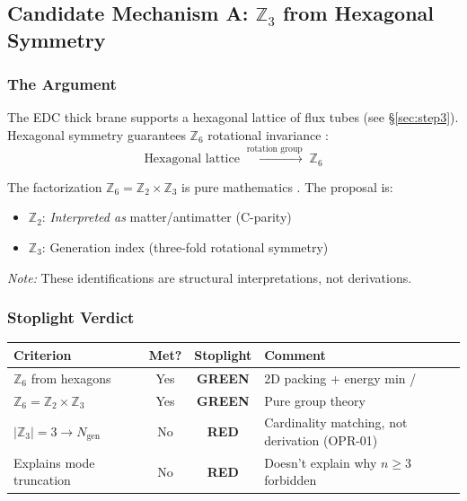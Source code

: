 \subsection{\texorpdfstring{Candidate Mechanism A: $\mathbb{Z}_3$ from Hexagonal Symmetry}{Candidate Mechanism A: Z3 from Hexagonal Symmetry}}
\label{sec:ch5_mechanism_a}

\subsubsection{The Argument}

The EDC thick brane supports a hexagonal lattice of flux tubes (see \S\ref{sec:step3}).
Hexagonal symmetry guarantees $\mathbb{Z}_6$ rotational invariance \tagDc{}:
\begin{equation}
    \text{Hexagonal lattice} \;\xrightarrow{\text{rotation group}}\; \mathbb{Z}_6
    \label{eq:ch5_hex_to_z6}
\end{equation}

The factorization $\mathbb{Z}_6 = \mathbb{Z}_2 \times \mathbb{Z}_3$ is pure
mathematics \tagM{}. The proposal is:
\begin{itemize}[nosep]
    \item $\mathbb{Z}_2$: \emph{Interpreted as} matter/antimatter (C-parity) \tagP{}
    \item $\mathbb{Z}_3$: Generation index (three-fold rotational symmetry) \tagP{}
\end{itemize}
\emph{Note:} These identifications are structural interpretations, not derivations.

\subsubsection{Stoplight Verdict}

\begin{center}
\small
\begin{tabular}{p{3cm}ccp{5cm}}
\toprule
\textbf{Criterion} & \textbf{Met?} & \textbf{Stoplight} & \textbf{Comment} \\
\midrule
$\mathbb{Z}_6$ from hexagons & Yes & \textcolor{green!50!black}{\textbf{GREEN}} & 2D packing + energy min \tagDc{}/\tagP{} \\
$\mathbb{Z}_6 = \mathbb{Z}_2 \times \mathbb{Z}_3$ & Yes & \textcolor{green!50!black}{\textbf{GREEN}} & Pure group theory \tagM{} \\
$|\mathbb{Z}_3| = 3 \to N_{\text{gen}}$ & No & \textcolor{red!80!black}{\textbf{RED}} & Cardinality matching, not derivation (OPR-01) \\
Explains mode truncation & No & \textcolor{red!80!black}{\textbf{RED}} & Doesn't explain why $n \geq 3$ forbidden \\
\bottomrule
\end{tabular}
\end{center}

